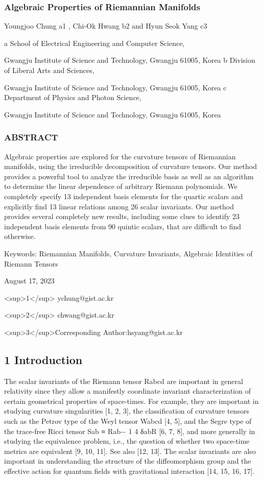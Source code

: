 \documentclass{article}
\begin{document}
\subsubsection{Algebraic Properties of Riemannian Manifolds}

Youngjoo Chung a1 , Chi-Ok Hwang b2 and Hyun Seok Yang c3

a School of Electrical Engineering and Computer Science,

Gwangju Institute of Science and Technology, Gwangju 61005, Korea b Division of Liberal Arts and Sciences,

Gwangju Institute of Science and Technology, Gwangju 61005, Korea c Department of Physics and Photon Science,

Gwangju Institute of Science and Technology, Gwangju 61005, Korea

\subsubsection{ABSTRACT}

Algebraic properties are explored for the curvature tensors of Riemannian manifolds, using the irreducible decomposition of curvature tensors. Our method provides a powerful tool to analyze the irreducible basis as well as an algorithm to determine the linear dependence of arbitrary Riemann polynomials. We completely specify 13 independent basis elements for the quartic scalars and explicitly find 13 linear relations among 26 scalar invariants. Our method provides several completely new results, including some clues to identify 23 independent basis elements from 90 quintic scalars, that are difficult to find otherwise.

Keywords: Riemannian Manifolds, Curvature Invariants, Algebraic Identities of Riemann Tensors

August 17, 2023

<sup>1</sup> ychung@gist.ac.kr

<sup>2</sup> chwang@gist.ac.kr

<sup>3</sup>Corresponding Author:hsyang@gist.ac.kr

\subsection{1 Introduction}

The scalar invariants of the Riemann tensor Rabcd are important in general relativity since they allow a manifestly coordinate invariant characterization of certain geometrical properties of space-times. For example, they are important in studying curvature singularities [1, 2, 3], the classification of curvature tensors such as the Petrov type of the Weyl tensor Wabcd [4, 5], and the Segre type of the trace-free Ricci tensor Sab ≡ Rab− 1 4 δabR [6, 7, 8], and more generally in studying the equivalence problem, i.e., the question of whether two space-time metrics are equivalent [9, 10, 11]. See also [12, 13]. The scalar invariants are also important in understanding the structure of the diffeomorphism group and the effective action for quantum fields with gravitational interaction [14, 15, 16, 17].
\end{document}
